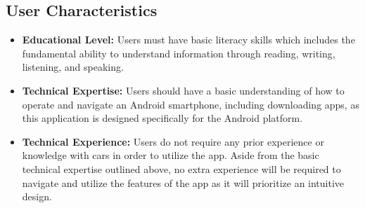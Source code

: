 \documentclass[]{article}
\begin{document}
\subsection{User Characteristics}
\label{sub:user_characteristics}

\begin{itemize}
	\item \textbf{Educational Level:} Users must have basic literacy skills which includes the fundamental ability to understand information through reading, writing, listening, and speaking.
	\item \textbf{Technical Expertise:} Users should have a basic understanding of how to operate and navigate an Android smartphone, including downloading apps, as this application is designed specifically for the Android platform.
	\item \textbf{Technical Experience:} Users do not require any prior experience or knowledge with cars in order to utilize the app. Aside from the basic technical expertise outlined above, no extra experience will be required to navigate and utilize the features of the app as it will prioritize an intuitive design.
\end{itemize}
\end{document}
